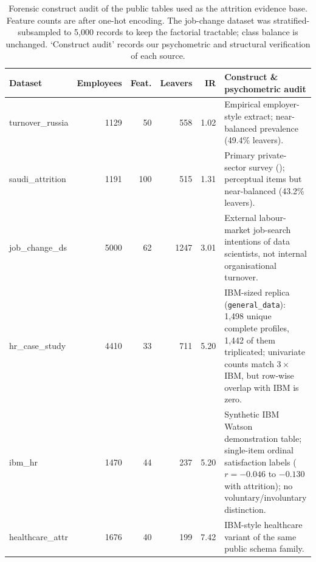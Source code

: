 \documentclass[12pt,a4paper]{article}
\begin{document}
\begin{table}[p]
\centering\singlespacing\small\setlength{\tabcolsep}{3pt}
\caption{Forensic construct audit of the public tables used as the attrition evidence base. Feature counts are after one-hot encoding. The job-change dataset was stratified-subsampled to 5,000 records to keep the factorial tractable; class balance is unchanged. `Construct audit' records our psychometric and structural verification of each source.}
\label{tab:1}
\begin{tabularx}{\textwidth}{@{}lrrrrX@{}}
\toprule
\textbf{Dataset} & \textbf{Employees} & \textbf{Feat.} & \textbf{Leavers} & \textbf{IR} & \textbf{Construct \& psychometric audit} \\
\midrule
turnover\_russia & 1129 & 50 & 558 & 1.02 & Empirical employer-style extract; near-balanced prevalence (49.4\% leavers). \\
saudi\_attrition & 1191 & 100 & 515 & 1.31 & Primary private-sector survey (\cite{ref4}); perceptual items but near-balanced (43.2\% leavers). \\
job\_change\_ds & 5000 & 62 & 1247 & 3.01 & External labour-market job-search intentions of data scientists, not internal organisational turnover. \\
hr\_case\_study & 4410 & 33 & 711 & 5.20 & IBM-sized replica (\texttt{general\_data}): 1,498 unique complete profiles, 1,442 of them triplicated; univariate counts match $3 \times$ IBM, but row-wise overlap with IBM is zero. \\
ibm\_hr & 1470 & 44 & 237 & 5.20 & Synthetic IBM Watson demonstration table; single-item ordinal satisfaction labels ($r = -0.046$ to $-0.130$ with attrition); no voluntary/involuntary distinction. \\
healthcare\_attr & 1676 & 40 & 199 & 7.42 & IBM-style healthcare variant of the same public schema family. \\
\bottomrule
\end{tabularx}
\end{table}
\clearpage
\end{document}
